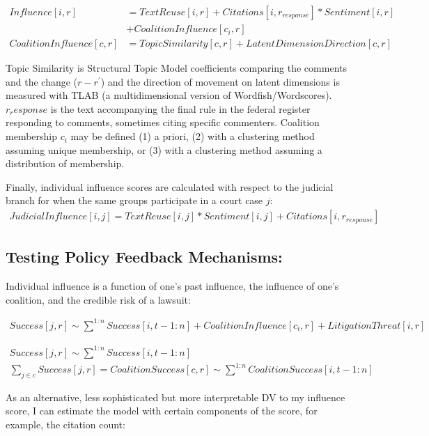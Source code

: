 \removelastskip
\begin{align}Influence[i, r] &= TextReuse[i, r] + Citations[i, r_{response}]*Sentiment[i, r] \\&+ CoalitionInfluence[c_i, r]
\\
CoalitionInfluence[c, r] &= TopicSimilarity[c, r] + LatentDimensionDirection[c, r]
\end{align}

Topic Similarity is Structural Topic Model coefficients comparing the comments 
and the change ($r-r^{\prime}$) and the direction of movement on latent dimensions is measured with TLAB (a multidimensional version of Wordfish/Wordscores). $r_response$ is the text accompanying the final rule in the federal register responding to comments, sometimes citing specific commenters. Coalition membership $c_i$ may be defined (1) a priori, (2) with a clustering method assuming unique membership, or (3) with a clustering method assuming a distribution of membership.

Finally, individual influence scores are calculated with respect to the judicial branch for when the same groups participate in a court case $j$:
\removelastskip\begin{align}JudicialInfluence[i, j] = TextReuse[i, j]*Sentiment[i, j] + Citations[i, r_{response}]\end{align}


\subsection{Testing Policy Feedback Mechanisms: }

Individual influence is a function of one's past influence, the influence of one's coalition, and the credible risk of a lawsuit:

\begin{align}Success[j, r] \sim \sum^{1:n} Success[i, t-1:n] + CoalitionInfluence[c_i, r] + LitigationThreat[i, r]\end{align}

\begin{align}
Success[j, r] \sim \sum^{1:n} Success[i, t-1:n]\\
\sum_{j \in c} Success[j, r] = CoalitionSuccess[c, r] \sim \sum^{1:n} CoalitionSuccess[i, t-1:n]
\end{align}

As an alternative, less sophisticated but more interpretable DV to my influence score, I can estimate the model with certain components of the score, for example, the citation count:

